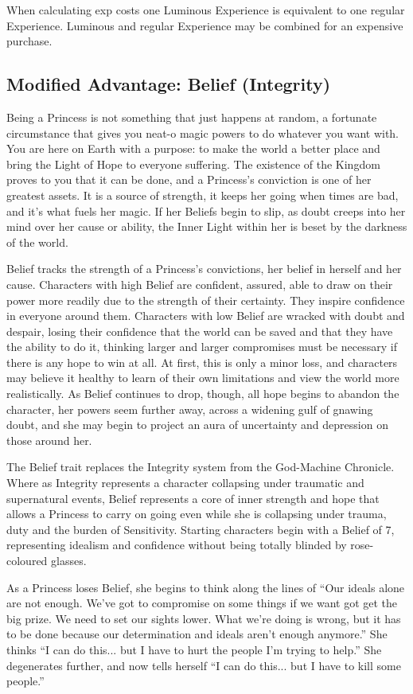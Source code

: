 When calculating exp costs one Luminous Experience is equivalent to one regular Experience. Luminous and regular Experience may be combined for an expensive purchase. 

\subsection*{Modified Advantage: Belief (Integrity)}
\noindent Being a Princess is not something that just happens at random, a fortunate circumstance that gives you neat-o magic powers to do whatever you want with. You are here on Earth with a purpose: to make the world a better place and bring the Light of Hope to everyone suffering. The existence of the Kingdom proves to you that it can be done, and a Princess's conviction is one of her greatest assets. It is a source of strength, it keeps her going when times are bad, and it's what fuels her magic. If her Beliefs begin to slip, as doubt creeps into her mind over her cause or ability, the Inner Light within her is beset by the darkness of the world.

Belief tracks the strength of a Princess's convictions, her belief in herself and her cause. Characters with high Belief are confident, assured, able to draw on their power more readily due to the strength of their certainty. They inspire confidence in everyone around them. Characters with low Belief are wracked with doubt and despair, losing their confidence that the world can be saved and that they have the ability to do it, thinking larger and larger compromises must be necessary if there is any hope to win at all. At first, this is only a minor loss, and characters may believe it healthy to learn of their own limitations and view the world more realistically. As Belief continues to drop, though, all hope begins to abandon the character, her powers seem further away, across a widening gulf of gnawing doubt, and she may begin to project an aura of uncertainty and depression on those around her.

The Belief trait replaces the Integrity system from the God-Machine Chronicle. Where as Integrity represents a character collapsing under traumatic and supernatural events, Belief represents a core of inner strength and hope that allows a Princess to carry on going even while she is collapsing under trauma, duty and the burden of Sensitivity. Starting characters begin with a Belief of 7, representing idealism and confidence without being totally blinded by rose-coloured glasses. 

As a Princess loses Belief, she begins to think along the lines of “Our ideals alone are not enough. We've got to compromise on some things if we want got get the big prize. We need to set our sights lower. What we're doing is wrong, but it has to be done because our determination and ideals aren't enough anymore.” She thinks “I can do this... but I have to hurt the people I'm trying to help.” She degenerates further, and now tells herself “I can do this... but I have to kill some people.” 

